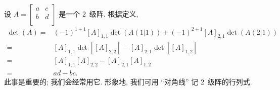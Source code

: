 \begin{example}
    设
    \(
    A = \begin{bmatrix}
        a & c \\
        b & d \\
    \end{bmatrix}
    \)
    是一个 \(2\)~级阵.
    根据定义,
    \begin{align*}
        \det {(A)}
        = {} & (-1)^{1+1} [A]_{1,1} \det {(A(1|1))}
        + (-1)^{2+1} [A]_{2,1} \det {(A(2|1))}           \\
        = {} & [A]_{1,1} \det {[[A]_{2,2}]}
        - [A]_{2,1} \det {[[A]_{1,2}]}                   \\
        = {} & [A]_{1,1} [A]_{2,2} - [A]_{2,1} [A]_{1,2} \\
        = {} & ad - bc.
    \end{align*}
    此事是重要的;
    我们会经常用它.
    形象地, 我们可用 ``对角线'' 记
    \(2\)~级阵的行列式.
    \begin{tikzbildo*}[h!]
        \centering
    \end{tikzbildo*}
\end{example}

